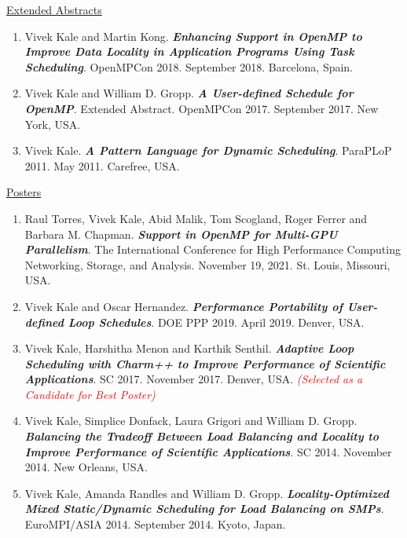 \underline{Extended Abstracts}
\begin{enumerate}
\item Vivek Kale and Martin Kong. \textbf{\textit{Enhancing Support in OpenMP to Improve Data Locality in Application Programs Using Task Scheduling}}. OpenMPCon 2018. September 2018. Barcelona, Spain.
\item Vivek Kale and William D. Gropp. \textbf{\textit{A User-defined Schedule for OpenMP}}. Extended Abstract. OpenMPCon
  2017. September 2017. New York, USA.
\item Vivek Kale. \textbf{\textit{A Pattern Language for Dynamic Scheduling}}. ParaPLoP 2011. May 2011. Carefree, USA.
\end{enumerate}

\underline{Posters}
\begin{enumerate}
\item Raul Torres, Vivek Kale, Abid Malik, Tom Scogland, Roger Ferrer and Barbara M. Chapman. \textbf{\textit{Support in OpenMP for Multi-GPU Parallelism}}. The International Conference for High Performance Computing Networking, Storage, and Analysis. November 19, 2021. St. Louis, Missouri, USA.
\item Vivek Kale and Oscar Hernandez. {\bf\textit{Performance Portability of User-defined Loop Schedules}}. DOE PPP 2019. April 2019. Denver, USA.
\item Vivek Kale, Harshitha Menon and Karthik Senthil. \textbf{\textit{Adaptive Loop Scheduling with Charm++ to Improve Performance of Scientific Applications}}. SC 2017. November 2017. Denver, USA. \textit{\textcolor{red}{(Selected as a Candidate for Best Poster)}}
\item Vivek Kale, Simplice Donfack, Laura Grigori and William D. Gropp. \textbf{\textit{Balancing the Tradeoff Between Load Balancing and Locality to Improve Performance of Scientific Applications}}. SC 2014. November 2014. New Orleans, USA.
\item Vivek Kale, Amanda Randles and William D. Gropp. \textbf{\textit{Locality-Optimized Mixed Static/Dynamic
      Scheduling for Load Balancing on SMPs}}. EuroMPI/ASIA 2014. September 2014. Kyoto, Japan.
\end{enumerate}



